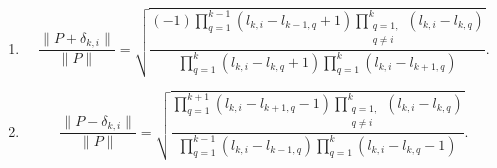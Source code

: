 \documentclass[10pt,a4paper]{amsart}
\begin{document}
\begin{proposition} \label{prop: ratio of lengths} \mbox{}
  \begin{enumerate}
    \item
  \[
    \frac{\|P + \delta_{k,i} \|}{\| P \|} = \sqrt{\frac{(-1)
    \displaystyle  \prod_{q=1}^{k-1}(l_{k,i}-l_{k-1,q}+1) \displaystyle\prod_{\substack{q=1,\\q\neq i}}^{k} (l_{k,i}-l_{k,q})}{\displaystyle\prod_{q=1}^{k}(l_{k,i}-l_{k,q}+1) \displaystyle\prod_{q=1}^{k} (l_{k,i}-l_{k+1,q})}}.
\]
\item
    \[
    \frac{\|P - \delta_{k,i} \|}{\| P \|} = \sqrt{\frac{
    \displaystyle  \prod_{q=1}^{k+1}(l_{k,i}-l_{k+1,q}-1) \displaystyle\prod_{\substack{q=1,\\q\neq i}}^{k} (l_{k,i}-l_{k,q})}{\displaystyle\prod_{q=1}^{k-1}(l_{k,i}-l_{k-1,q}) \displaystyle\prod_{q=1}^{k} (l_{k,i}-l_{k,q}-1)}}.
\]
\end{enumerate}
\end{proposition}
\end{document}
